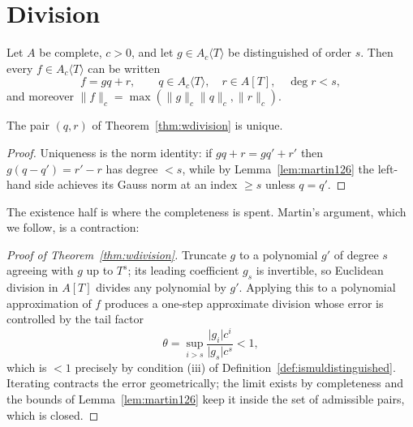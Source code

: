 \section{Division}

\begin{theorem}
  \label{thm:wdivision}
  \leanok
  Let $A$ be complete, $c > 0$, and let $g \in A_c\langle T\rangle$ be distinguished of order
  $s$.  Then every $f \in A_c\langle T \rangle$ can be written
  \[
    f = g q + r, \qquad q \in A_c\langle T\rangle, \quad r \in A[T], \quad \deg r < s,
  \]
  and moreover $\lVert f \rVert_c = \max ( \lVert g \rVert_c \lVert q \rVert_c , \lVert r
  \rVert_c )$.
\end{theorem}

\begin{theorem}[Uniqueness]
  \label{thm:wdivision-unique}
  \leanok
  The pair $(q, r)$ of Theorem~\ref{thm:wdivision} is unique.
\end{theorem}

\begin{proof}
  \leanok
  Uniqueness is the norm identity: if $gq + r = gq' + r'$ then $g(q - q') = r' - r$ has degree
  $< s$, while by Lemma~\ref{lem:martin126} the left-hand side achieves its Gauss norm at an
  index $\geq s$ unless $q = q'$.
\end{proof}

The existence half is where the completeness is spent.  Martin's argument, which we follow, is
a contraction:

\begin{proof}[Proof of Theorem~\ref{thm:wdivision}]
  \leanok
  Truncate $g$ to a polynomial $g'$ of degree $s$ agreeing with $g$ up to $T^s$; its leading
  coefficient $g_s$ is invertible, so Euclidean division in $A[T]$ divides any polynomial by
  $g'$.  Applying this to a polynomial approximation of $f$ produces a one-step approximate
  division whose error is controlled by the tail factor
  \[
    \theta = \sup_{i > s} \frac{\lvert g_i \rvert c^i}{\lvert g_s \rvert c^s} < 1,
  \]
  which is $< 1$ precisely by condition (iii) of Definition~\ref{def:ismuldistinguished}.
  Iterating contracts the error geometrically; the limit exists by completeness and the bounds of
  Lemma~\ref{lem:martin126} keep it inside the set of admissible pairs, which is closed.
\end{proof}

